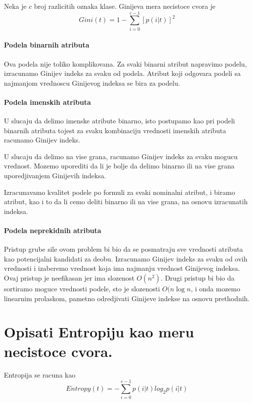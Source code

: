 \documentclass[a4paper]{article}
\begin{document}
Neka je \(c\) broj razlicitih oznaka klase. Ginijeva mera necistoce cvora je
\begin{equation}\label{eq:gini}
    Gini(t) = 1 - \sum_{i=0}^{c-1} [p(i|t)]^2
\end{equation}

\paragraph{Podela binarnih atributa} Ova podela nije toliko komplikovana. Za svaki binarni atribut
napravimo podelu, izracunamo Ginijev indeks za svaku od podela. Atribut koji odgovara podeli sa
najmanjom vrednoscu Ginijevog indeksa se bira za podelu.

\paragraph{Podela imenskih atributa} U slucaju da delimo imenske atribute binarno, isto postupamo
kao pri podeli binarnih atributa tojest za svaku kombinaciju vrednosti imenskih atributa racunamo
Ginijev indeks.

U slucaju da delimo na vise grana, racunamo Ginijev indeks za svaku mogucu vrednost. Mozemo
uporediti da li je bolje da delimo binarno ili na vise grana uporedjivanjem Ginijevih indeksa.

Izracunavamo kvalitet podele po formuli za svaki nominalni atribut, i biramo atribut, kao i to da li
cemo deliti binarno ili na vise grana, na osnovu izracunatih indeksa.

\paragraph{Podela neprekidnih atributa} Pristup grube sile ovom problem bi bio da se posmatraju sve
vrednosti atributa kao potencijalni kandidati za deobu. Izracunamo Ginijev indeks za svaku od ovih
vrednosti i izaberemo vrednost koja ima najmanju vrednost Ginijevog indeksa. Ovaj pristup je
neefikasan jer ima slozenost \(O(n^2)\). Drugi pristup bi bio da sortiramo moguce vrednosti podele,
sto je slozenosti \(O(n\log n\), i onda mozemo linearnim prolaskom, pametno odredjivati Ginijeve
indekse na osnovu prethodnih.

\section{Opisati Entropiju kao meru necistoce cvora.}
Entropija se racuna kao
\[
    Entropy(t) = - \sum_{i=0}^{c-1} p(i|t)log_2 p(i|t)
\]
\end{document}

